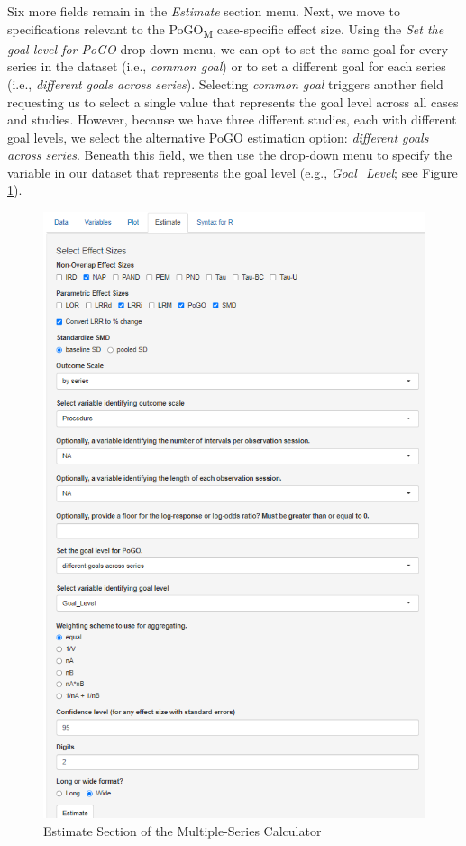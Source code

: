 \documentclass[
]{book}
\begin{document}
Six more fields remain in the \emph{Estimate} section menu. Next, we move to specifications relevant to the PoGO\textsubscript{M} case-specific effect size. Using the \emph{Set the goal level for PoGO} drop-down menu, we can opt to set the same goal for every series in the dataset (i.e., \emph{common goal}) or to set a different goal for each series (i.e., \emph{different goals across series}). Selecting \emph{common goal} triggers another field requesting us to select a single value that represents the goal level across all cases and studies. However, because we have three different studies, each with different goal levels, we select the alternative PoGO estimation option: \emph{different goals across series}. Beneath this field, we then use the drop-down menu to specify the variable in our dataset that represents the goal level (e.g., \emph{Goal\_Level}; see Figure \ref{fig:multipleseries-est-filled}).

\begin{figure}
\includegraphics[width=0.6\linewidth]{images/multiseries_estimate_filled} \caption{Estimate Section of the Multiple-Series Calculator}\label{fig:multipleseries-est-filled}
\end{figure}
\end{document}
